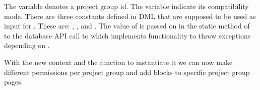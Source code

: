 The  variable denotes a project group id.
The  variable indicate its compatibility mode.
There are three constants defined in \moodle{} DML that are supposed to be used as input for .
These are: , , and .
The value of  is passed on in the static method  of  to the \moodle{} database API call to  which implements functionality to throw exceptions depending on .

With the new context and the function to instantiate it we can now make different permissions per project group and add blocks to specific project group pages. 
